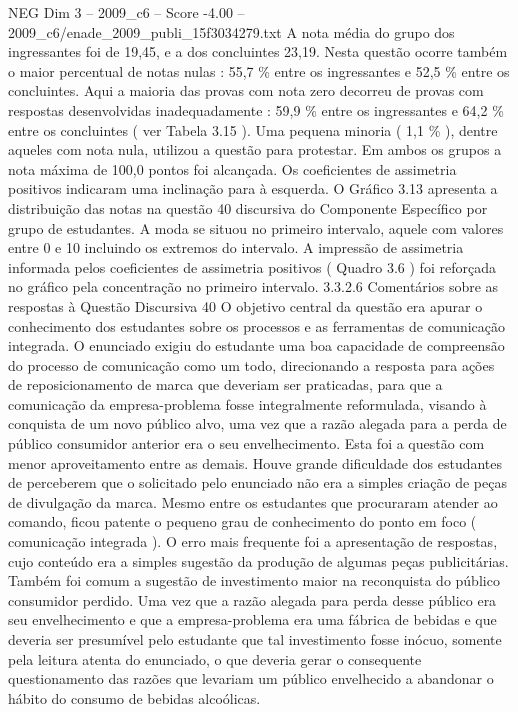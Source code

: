 \begin{textsample}{NEG Dim 3 – 2009\_c6 – Score -4.00 – 2009\_c6/enade\_2009\_publi\_15f3034279.txt}
A nota média do grupo dos ingressantes foi de 19,45, e a dos concluintes 23,19.
Nesta questão ocorre também o maior percentual de notas nulas : 55,7 \% entre os ingressantes e 52,5 \% entre os concluintes.
Aqui a maioria das provas com nota zero decorreu de provas com respostas desenvolvidas inadequadamente : 59,9 \% entre os ingressantes e 64,2 \% entre os concluintes ( ver Tabela 3.15 ).
Uma pequena minoria ( 1,1 \% ), dentre aqueles com nota nula, utilizou a questão para protestar.
Em ambos os grupos a nota máxima de 100,0 pontos foi alcançada.
Os coeficientes de assimetria positivos indicaram uma inclinação para à esquerda.
O Gráfico 3.13 apresenta a distribuição das notas na questão 40 discursiva do Componente Específico por grupo de estudantes.
A moda se situou no primeiro intervalo, aquele com valores entre 0 e 10 incluindo os extremos do intervalo.
A impressão de assimetria informada pelos coeficientes de assimetria positivos ( Quadro 3.6 ) foi reforçada no gráfico pela concentração no primeiro intervalo. 3.3.2.6 Comentários sobre as respostas à Questão Discursiva 40 O objetivo central da questão era apurar o conhecimento dos estudantes sobre os processos e as ferramentas de comunicação integrada.
O enunciado exigiu do estudante uma boa capacidade de compreensão do processo de comunicação como um todo, direcionando a resposta para ações de reposicionamento de marca que deveriam ser praticadas, para que a comunicação da empresa-problema fosse integralmente reformulada, visando à conquista de um novo público alvo, uma vez que a razão alegada para a perda de público consumidor anterior era o seu envelhecimento.
Esta foi a questão com menor aproveitamento entre as demais.
Houve grande dificuldade dos estudantes de perceberem que o solicitado pelo enunciado não era a simples criação de peças de divulgação da marca.
Mesmo entre os estudantes que procuraram atender ao comando, ficou patente o pequeno grau de conhecimento do ponto em foco ( comunicação integrada ).
O erro mais frequente foi a apresentação de respostas, cujo conteúdo era a simples sugestão da produção de algumas peças publicitárias.
Também foi comum a sugestão de investimento maior na reconquista do público consumidor perdido.
Uma vez que a razão alegada para perda desse público era seu envelhecimento e que a empresa-problema era uma fábrica de bebidas e que deveria ser presumível pelo estudante que tal investimento fosse inócuo, somente pela leitura atenta do enunciado, o que deveria gerar o consequente questionamento das razões que levariam um público envelhecido a abandonar o hábito do consumo de bebidas alcoólicas.

\end{textsample}
